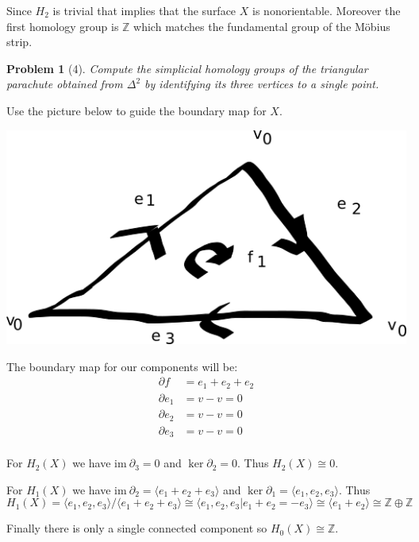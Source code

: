 \documentclass[10pt]{article}
\newcommand{\sk}{\vskip 10mm}
\newcommand{\bb}[1]{\mathbb{#1}}
\newcommand{\ima}{\mathrm{im}\ }
\theoremstyle{plain}
\newtheorem{problem}{Problem}
\theoremstyle{remark}
\begin{document}
Since $H_2$ is trivial that implies that the surface $X$ is nonorientable.
Moreover the first homology group is $\bb{Z}$ which matches the
fundamental group of the M\"obius strip.

\sk

\begin{problem}[4]
  Compute the simplicial homology groups of the triangular parachute
  obtained from $\Delta^2$ by identifying its three vertices to a single point.
\end{problem}

Use the picture below to guide the boundary map for $X$.\\

\begin{center}
\includegraphics[scale=.5]{p4}  
\end{center}

The boundary map for our components will be:
\begin{align*}
  \partial f &= e_1+e_2+e_2\\
  \partial e_1 &= v-v=0\\
  \partial e_2 &= v-v=0\\
  \partial e_3 &= v-v=0\\
\end{align*}

For $H_2(X)$ we have $\ima \partial_3=0$ and $\ker\partial_2=0$. Thus
$H_2(X)\cong 0$.

For $H_1(X)$ we have $\ima \partial_2=\langle e_1+e_2+e_3\rangle$ and $\ker\partial_1=\langle e_1,e_2,e_3\rangle$.
Thus
\[ H_1(X)=\langle e_1,e_2,e_3\rangle/\langle e_1+e_2+e_3\rangle\cong\langle e_1,e_2,e_3|e_1+e_2=-e_3\rangle\cong\langle e_1+e_2\rangle\cong\bb{Z}\oplus\bb{Z}\]

Finally there is only a single connected component so $H_0(X)\cong\bb{Z}$.
\end{document}
